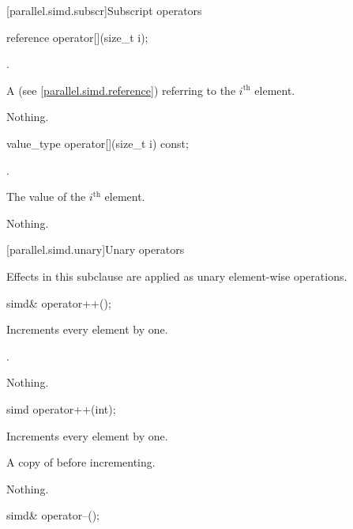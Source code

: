 [parallel.simd.subscr]{Subscript operators}

\begin{itemdecl}
reference operator[](size_t i);
\end{itemdecl}

\begin{itemdescr}
  \pnum\requires
  .

  \pnum\returns
  A  (see \ref{parallel.simd.reference}) referring to the $i^\text{th}$ element.

  \pnum\throws Nothing.
\end{itemdescr}

\begin{itemdecl}
value_type operator[](size_t i) const;
\end{itemdecl}

\begin{itemdescr}
  \pnum\requires
  .

  \pnum\returns
  The value of the $i^\text{th}$ element.

  \pnum\throws Nothing.
\end{itemdescr}

[parallel.simd.unary]{Unary operators}

\pnum
Effects in this subclause are applied as unary element-wise operations.

\begin{itemdecl}
simd& operator++();
\end{itemdecl}

\begin{itemdescr}
  \pnum\effects
  Increments every element by one.

  \pnum\returns
  .

  \pnum\throws Nothing.
\end{itemdescr}

\begin{itemdecl}
simd operator++(int);
\end{itemdecl}

\begin{itemdescr}
  \pnum\effects
  Increments every element by one.

  \pnum\returns
  A copy of  before incrementing.

  \pnum\throws Nothing.
\end{itemdescr}

\begin{itemdecl}
simd& operator--();
\end{itemdecl}

